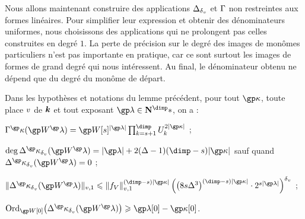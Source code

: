 Nous allons maintenant construire des applications \( \Delta_{\delta\smash{_v}} \) et \(
  \Gamma \) non restreintes aux formes linéaires. Pour simplifier leur
expression et obtenir des dénominateurs uniformes, nous choisissons des
applications qui ne prolongent pas celles construites en degré \( 1 \). La
perte de précision sur le degré des images de monômes particuliers n'est pas
importante en pratique, car ce sont surtout les images de formes de grand
degré qui nous intéressent. Au final, le dénominateur obtenu ne dépend que du
degré du monôme de départ.

\begin{lem} \label{l:par-anyvar-mono}
  Dans les hypothèses et notations du lemme précédent, pour tout \( \derp \),
  toute place \( v \) de \( {\boldsymbol k} \) et tout exposant \( \ip \in \N^\dimp*
  \), on a :
  \begin{enumthm}
    \item \( \pmden^\derp( \anyvp^\ip )
        =
        \anyvp[\anydim]^{\lgr\ip}
        \prod_{\ind = \anydim + 1}^{\dimp} \pden_\ind^{2\lgr\derp}
      \) ;
    \item \( \deg \pmnum^\derp_\dv (\anyvp^\ip)
        = \lgr\ip + 2 (\anydeg - 1) (\dimp - \anydim) \lgr\derp \) sauf quand
      \( \pmnum^\derp_\dv (\anyvp^\ip) = 0 \) ;
    \item \(
        \nv1{ \pmnum^\derp_\dv (\anyvp^\ip) }
        \le
        \nv1{ \chow\anyvar }^{(\dimp - \anydim) \lgr\derp}
        \left(
          \bigl( 8 \anydim \anydeg^{3} \bigr)^{(\dimp - \anydim) \lgr\derp}
          \cdot 2^{ \anydim \lgr\ip }
        \right)^\dv
      \) ;
    \item \( \ord_{\anyvp[0]} \bigl( \pmnum^\derp_\dv (\anyvp^\ip) \bigr)
        \ge \ip[0] - \derp[0] \).
  \end{enumthm}
\end{lem}

